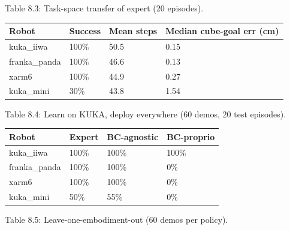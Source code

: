 \documentclass[
]{article}
\newcounter{none} %
\begin{document}
Table 8.3: Task-space transfer of expert (20 episodes).

{\def\LTcaptype{none} %
\begin{longtable}[]{@{}llll@{}}
\toprule\noalign{}
Robot & Success & Mean steps & Median cube-goal err (cm) \\
\midrule\noalign{}
\endhead
\bottomrule\noalign{}
\endlastfoot
kuka\_iiwa & 100\% & 50.5 & 0.15 \\
franka\_panda & 100\% & 46.6 & 0.13 \\
xarm6 & 100\% & 44.9 & 0.27 \\
kuka\_mini & 30\% & 43.8 & 1.54 \\
\end{longtable}
}

Table 8.4: Learn on KUKA, deploy everywhere (60 demos, 20 test
episodes).

{\def\LTcaptype{none} %
\begin{longtable}[]{@{}llll@{}}
\toprule\noalign{}
Robot & Expert & BC-agnostic & BC-proprio \\
\midrule\noalign{}
\endhead
\bottomrule\noalign{}
\endlastfoot
kuka\_iiwa & 100\% & 100\% & 100\% \\
franka\_panda & 100\% & 100\% & 0\% \\
xarm6 & 100\% & 100\% & 0\% \\
kuka\_mini & 50\% & 55\% & 0\% \\
\end{longtable}
}

Table 8.5: Leave-one-embodiment-out (60 demos per policy).
\end{document}

